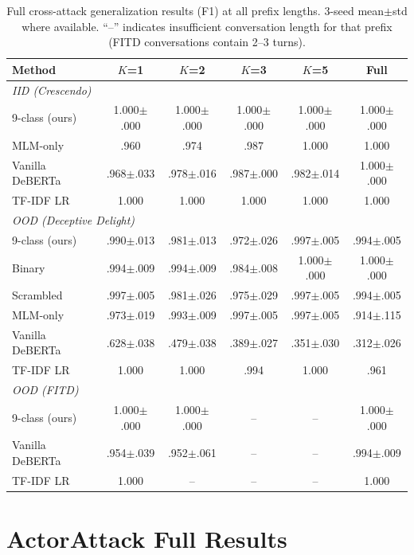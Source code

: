 \begin{table}[t]
\centering
\small
\caption{Full cross-attack generalization results (F1) at all prefix lengths. 3-seed mean$\pm$std where available. ``--'' indicates insufficient conversation length for that prefix (FITD conversations contain 2--3 turns).}
\label{tab:full_prefix}
\begin{tabular}{@{}lccccc@{}}
\toprule
\textbf{Method} & $K$=1 & $K$=2 & $K$=3 & $K$=5 & Full \\
\midrule
\multicolumn{6}{l}{\textit{IID (Crescendo)}} \\[2pt]
9-class (ours) & 1.000$\pm$.000 & 1.000$\pm$.000 & 1.000$\pm$.000 & 1.000$\pm$.000 & 1.000$\pm$.000 \\
MLM-only & .960 & .974 & .987 & 1.000 & 1.000 \\
Vanilla DeBERTa & .968$\pm$.033 & .978$\pm$.016 & .987$\pm$.000 & .982$\pm$.014 & 1.000$\pm$.000 \\
TF-IDF LR & 1.000 & 1.000 & 1.000 & 1.000 & 1.000 \\
\midrule
\multicolumn{6}{l}{\textit{OOD (Deceptive Delight)}} \\[2pt]
9-class (ours) & .990$\pm$.013 & .981$\pm$.013 & .972$\pm$.026 & .997$\pm$.005 & .994$\pm$.005 \\
Binary & .994$\pm$.009 & .994$\pm$.009 & .984$\pm$.008 & 1.000$\pm$.000 & 1.000$\pm$.000 \\
Scrambled & .997$\pm$.005 & .981$\pm$.026 & .975$\pm$.029 & .997$\pm$.005 & .994$\pm$.005 \\
MLM-only & .973$\pm$.019 & .993$\pm$.009 & .997$\pm$.005 & .997$\pm$.005 & .914$\pm$.115 \\
Vanilla DeBERTa & .628$\pm$.038 & .479$\pm$.038 & .389$\pm$.027 & .351$\pm$.030 & .312$\pm$.026 \\
TF-IDF LR & 1.000 & 1.000 & .994 & 1.000 & .961 \\
\midrule
\multicolumn{6}{l}{\textit{OOD (FITD)}} \\[2pt]
9-class (ours) & 1.000$\pm$.000 & 1.000$\pm$.000 & -- & -- & 1.000$\pm$.000 \\
Vanilla DeBERTa & .954$\pm$.039 & .952$\pm$.061 & -- & -- & .994$\pm$.009 \\
TF-IDF LR & 1.000 & -- & -- & -- & 1.000 \\
\bottomrule
\end{tabular}
\end{table}

\section{ActorAttack Full Results}
\label{sec:actorattack_full}

